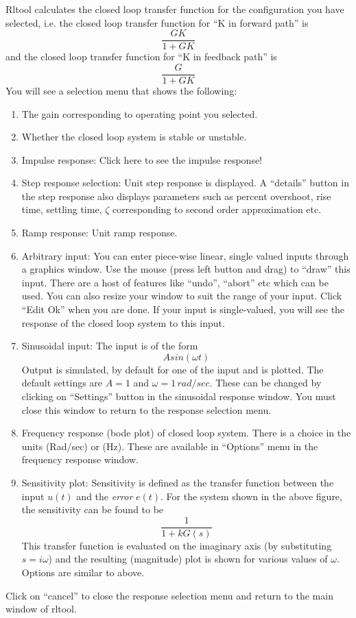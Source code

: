 Rltool calculates the closed loop transfer function for the
configuration you have selected, i.e. the closed loop transfer
function for ``K in forward path'' is
\[ \frac{G K}{1+G K} \]
and the closed loop transfer function for ``K in feedback path'' is
\[ \frac{G}{1+GK}\]
You will see a selection menu that shows the following:
\begin{enumerate}
\item The gain corresponding to operating point you selected.
\item Whether the closed loop system is stable or unstable.
\item Impulse response: Click here to see the impulse response!
\item Step response selection: Unit step response is displayed. A
``details'' button in the step response also displays parameters such
as percent overshoot, rise time, settling time, $\zeta$ corresponding
to second order approximation etc.
\item Ramp response: Unit ramp response.
\item Arbitrary input: You can enter piece-wise linear, single valued
inputs through a graphics window. Use the mouse (press left button and
drag) to ``draw'' this input. There are a host of features like
``undo'', ``abort'' etc which can be used. You can also resize your
window to suit the range of your input. Click ``Edit \rar Ok'' when you are
done. If your input is single-valued, you will see the response of the
closed loop system to this input. 
\item Sinusoidal input: The input is of the form
\[A sin (\omega t)\]
Output is simulated, by default for one of the input and is
plotted. The default settings are $A=1$ and $\omega=1 \,
rad/sec$. These can be changed by clicking on ``Settings'' button in
the sinusoidal response window. You must close this window to return
to the response selection menu.
\item Frequency response (bode plot) of closed loop system. There is a
choice in the units (Rad/sec) or (Hz). These are available in
``Options'' menu in the frequency response window. 
\item Sensitivity plot: Sensitivity is defined as the transfer
  function between the input $u(t)$ and the {\it error} $e(t)$. For
  the system shown in the above figure, the sensitivity can be found
  to be 
\[\frac{1}{1+kG(s)} \]
This transfer function is evaluated on the imaginary axis (by
substituting $s=i\omega$) and the resulting (magnitude) plot is shown
for various values of $\omega$.  Options are similar to above. 
\end{enumerate}
Click on ``cancel'' to close the response selection menu and return to
the main window of rltool. 

